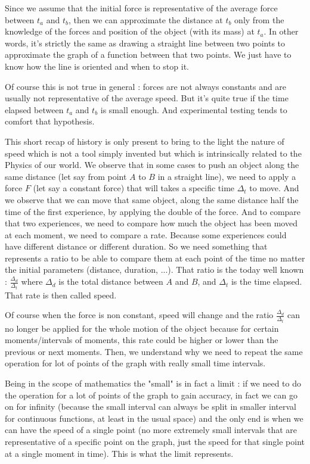 \documentclass[12pt]{article}
\begin{document}
Since we assume that the initial force is representative of the average force between $t_a$ and $t_b$, then we can approximate the distance at $t_b$ only from the knowledge of the forces and position of the object (with its mass) at $t_a$.
In other words, it's strictly the same as drawing a straight line between two points to approximate the graph of a function between that two points. We just have to know how the line is oriented and when to stop it.

Of course this is not true in general : forces are not always constants and are usually not representative of the average speed. But it's quite true if the time elapsed between $t_a$ and $t_b$ is small enough. And experimental testing tends to comfort that hypothesis. 

\bigskip

This short recap of history is only present to bring to the light the nature of speed which is not a tool simply invented but which is intrinsically related to the Physics of our world. We observe that in some cases to push an object along the same distance (let say from point $A$ to $B$ in a straight line), we need to apply a force $F$ (let say a constant force) that will takes a specific time $\Delta_t$ to move. And we observe that we can move that same object, along the same distance half the time of the first experience, by applying the double of the force.
And to compare that two experiences, we need to compare how much the object has been moved at each moment, we need to compare a rate. Because some experiences could have different distance or different duration. So we need something that represents a ratio to be able to compare them at each point of the time no matter the initial parameters (distance, duration, ...). That ratio is the today well known : $\frac{\Delta_d}{\Delta_t}$ where $\Delta_d$ is the total distance between $A$ and $B$, and $\Delta_t$ is the time elapsed. That rate is then called speed.

Of course when the force is non constant, speed will change and the ratio $\frac{\Delta_d}{\Delta_t}$ can no longer be applied for the whole motion of the object because for certain moments/intervals of moments, this rate could be higher or lower than the previous or next moments. Then, we understand why we need to repeat the same operation for lot of points of the graph with really small time intervals. 

Being in the scope of mathematics the "small" is in fact a limit : if we need to do the operation for a lot of points of the graph to gain accuracy, in fact we can go on for infinity (because the small interval can always be split in smaller interval for continuous functions, at least in the usual space) and the only end is when we can have the speed of a single point (no more extremely small intervals that are representative of a specific point on the graph, just the speed for that single point at a single moment in time). This is what the limit represents.
\end{document}
